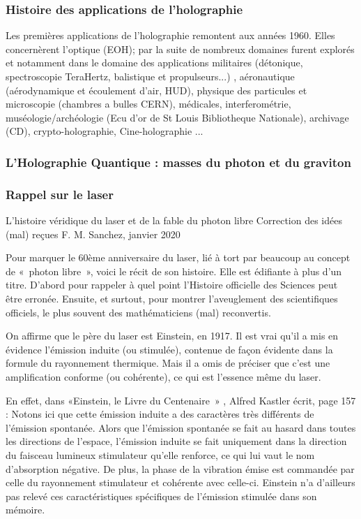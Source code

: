 \documentclass[a4paper,12pt]{article}
\begin{document}
\subsubsection{Histoire des applications de l'holographie}

Les premières applications de l'holographie remontent aux années 1960. Elles concernèrent l'optique (EOH); par la suite de nombreux domaines furent explorés et notamment dans le domaine des applications militaires (détonique, spectroscopie TeraHertz, balistique et propulseurs...) \cite{ISL}, aéronautique (aérodynamique et écoulement d'air, HUD), physique des particules et microscopie (chambres a bulles CERN), médicales, interferométrie, muséologie/archéologie (Ecu d'or de St Louis Bibliotheque Nationale), archivage (CD), crypto-holographie, Cine-holographie \cite{Bjelkhagen} ...



\subsubsection{L'Holographie Quantique : masses du photon et du graviton}

\subsubsection{Rappel sur le laser}

L'histoire véridique du laser et de la fable du photon libre
Correction des idées (mal) reçues
F. M. Sanchez, janvier 2020

Pour marquer le 60ème anniversaire du laser, lié à tort par beaucoup au concept de « photon libre »,  voici le récit de son histoire. Elle est édifiante à plus d'un titre. D'abord pour rappeler à quel point l'Histoire officielle des Sciences peut être erronée. Ensuite, et surtout, pour montrer l'aveuglement des scientifiques officiels, le plus souvent des mathématiciens (mal) reconvertis.

On affirme que le père du laser est Einstein, en 1917. Il est vrai qu'il a mis en évidence l'émission induite (ou stimulée), contenue de façon évidente dans la formule du rayonnement thermique. Mais il a omis de préciser que c'est une amplification conforme (ou cohérente), ce qui est l'essence même du laser.

En effet, dans «Einstein, le Livre du Centenaire » \cite{French}, Alfred Kastler écrit, page 157 : Notons ici que cette émission induite a des caractères très différents de l'émission spontanée. Alors que l'émission spontanée se fait au hasard dans toutes les directions de l'espace, l'émission induite se fait uniquement dans la direction du faisceau lumineux stimulateur qu'elle renforce, ce qui lui vaut le nom d'absorption négative. De plus, la phase de la vibration émise est commandée par celle du rayonnement stimulateur et cohérente avec celle-ci. Einstein n'a d'ailleurs pas relevé ces caractéristiques spécifiques de l'émission stimulée dans son mémoire.
\end{document}

